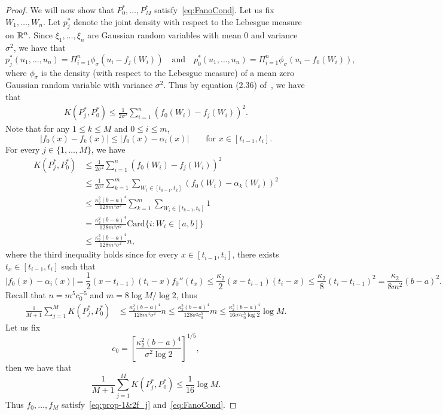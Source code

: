 \begin{proof}
We will now show that $P^*_0, \ldots, P^*_M$ satisfy~\eqref{eq:FanoCond}. Let us fix $W_1, \ldots, W_n$. Let $p^*_j$ denote the joint density with respect to the Lebesgue measure on $\mathbb{R}^n$. Since $\xi_1,\ldots, \xi_n$ are Gaussian random variables with mean $0$ and variance $\sigma^2$, we have that
\[ p^*_j(u_1,\ldots, u_n) =\Pi_{i=1}^n \phi_\sigma(u_i -f_j(W_i))\quad \text{and}\quad  p^*_0(u_1,\ldots, u_n) =\Pi_{i=1}^n \phi_\sigma(u_i -f_0(W_i)),\] where $\phi_\sigma$ is the density (with respect to the Lebesgue measure) of a mean zero Gaussian random variable with variance $\sigma^2.$ Thus by equation (2.36) of~\citet[Page 94]{MR2724359}, we have that 
\begin{align*}
  K(P^*_j, P^*_0)  \le \frac{1}{2 \sigma^2} \sum_{i=1}^n (f_0(W_i)- f_j(W_i))^2.
  \end{align*}  Note that for any $1\le k\le M$ and $0\le i\le m$, 
  \[|f_0(x)-f_k(x)| \le |f_0(x) -\alpha_i(x)|\qquad \text{for } x\in [t_{i-1}, t_i].\]  For every  $j \in \{1,\ldots, M\} $, we have 
  \begin{align*}
  K(P^*_j, P^*_0)  &\le \frac{1}{2 \sigma^2} \sum_{i=1}^n (f_0(W_i)- f_j(W_i))^2\\
  &\le \frac{1}{2 \sigma^2} \sum_{k=1}^m \sum_{W_i \in [t_{k-1}, t_k]} (f_0(W_i)- \alpha_k(W_i))^2\\
  &\le  \frac{\kappa_2^2(b-a)^4}{128 m^4 \sigma^2}\sum_{k=1}^m \sum_{W_i \in [t_{k-1}, t_k]} 1 \\
  &=  \frac{\kappa_2^2(b-a)^4}{128 m^4 \sigma^2}\text{Card}\{i: W_i\in [a, b]\}\\
  &\le \frac{ \kappa_2^2(b-a)^4}{128 m^4 \sigma^2} n,
  \end{align*}  where the third inequality holds since for every $x \in [t_{i-1},t_i]$, there exists $t_x\in [t_{i-1},t_i]$ such that 
\[ |f_0(x)- \alpha_i(x)| = \frac{1}{2} (x-t_{i-1}) (t_i-x) f_0''(t_x) \le \frac{\kappa_2}{2} (x-t_{i-1}) (t_i-x) \le \frac{\kappa_2}{8} (t_{i}- t_{i-1})^2= \frac{\kappa_2}{8 m^2} (b-a)^2.\]
Recall that $ n= m^5 c_0^{-5}$ and $m = 8 \log M/ \log 2$, thus
\begin{align*}
\frac{1}{M+1} \sum_{j=1}^{M}K(P^*_j, P^*_0) &\le \frac{ \kappa_2^2(b-a)^4}{128 m^4 \sigma^2} n \le \frac{ \kappa_2^2(b-a)^4}{128 \sigma^2 c_0^5} m \le  \frac{ \kappa_2^2(b-a)^4}{16 \sigma^2 c_0^5 \log 2} \log M.
\end{align*}
Let us fix \begin{equation}\label{eq:c_0_def}
c_0= \left[\frac{\kappa_2^2(b-a)^4 }{\sigma^2 \log 2 }\right]^{1/5},
\end{equation}
then we have that
\[\frac{1}{M+1} \sum_{j=1}^{M}K(P^*_j, P^*_0) \le \frac{1}{16}\log M.
\]
Thus $f_0, \ldots, f_M$  satisfy~\eqref{eq:prop-1&2f_j} and~\eqref{eq:FanoCond}. \qedhere
\end{proof}



